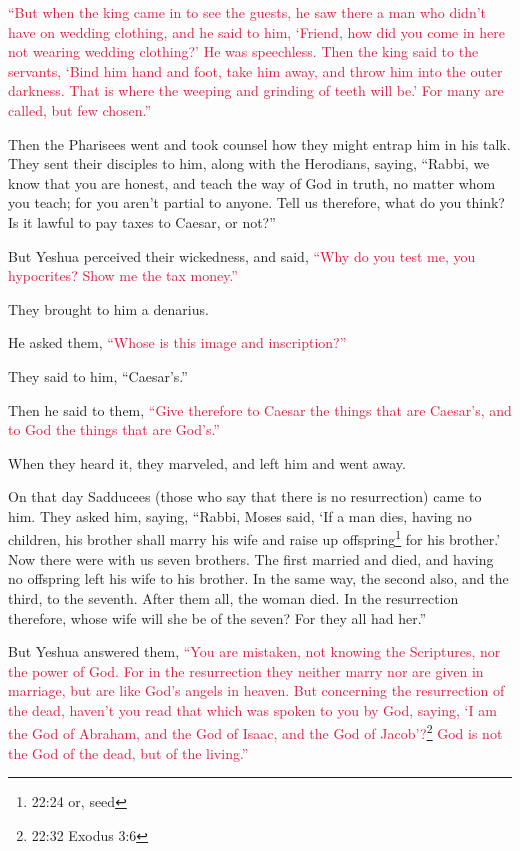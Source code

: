 \myverse{}\textcolor{crimson}{“But when the king came in to see the guests, he saw there
	a man who didn’t have on wedding clothing,
}
\myverse{}\textcolor{crimson}{and he said to him, ‘Friend, how did you come in here not wearing wedding
	clothing?’ He was speechless.
}
\myverse{}\textcolor{crimson}{Then the king said to the servants, ‘Bind him hand and foot, take him
	away, and throw him into the outer darkness. That is where the weeping and grinding of teeth will be.’
}
\myverse{}\textcolor{crimson}{For many are called, but few chosen.”}

\myverse{}Then the Pharisees went and took counsel how they might entrap
him in his talk.
\myverse{}They sent their disciples to him, along with the Herodians, saying, “Rabbi,
we know that you are honest, and teach the way of God in truth, no matter whom you teach; for you aren’t
partial to anyone.
\myverse{}Tell us therefore, what do you think? Is it lawful to pay taxes to Caesar,
or not?”

\myverse{}But Yeshua perceived their wickedness, and said,
\textcolor{crimson}{“Why do you test me, you hypocrites?
}
\myverse{}\textcolor{crimson}{Show me the tax money.”}

They brought to him a denarius.

\myverse{}He asked them,
\textcolor{crimson}{“Whose is this image and inscription?”}

\myverse{}They said to him, “Caesar’s.”

Then he said to them,
\textcolor{crimson}{“Give therefore to Caesar the things that are Caesar’s, and to God the things that are God’s.”}

\myverse{}When they heard it, they marveled, and left him and went away.

\myverse{}On that day Sadducees (those who say that there is no resurrection)
came to him. They asked him,
\myverse{}saying, “Rabbi, Moses said, ‘If a man dies, having no children, his brother
shall marry his wife and raise up offspring\footnote{22:24 or, seed} for his brother.’
\myverse{}Now there were with us seven brothers. The first married and died, and having
no offspring left his wife to his brother.
\myverse{}In the same way, the second also, and the third, to the seventh.
\myverse{}After them all, the woman died.
\myverse{}In the resurrection therefore, whose wife will she be of the seven? For they
all had her.”

\myverse{}But Yeshua answered them,
\textcolor{crimson}{“You are mistaken, not knowing the Scriptures, nor the power of God.
}
\myverse{}\textcolor{crimson}{For in the resurrection they neither marry nor are given in marriage,
	but are like God’s angels in heaven.
}
\myverse{}\textcolor{crimson}{But concerning the resurrection of the dead, haven’t you read that which
	was spoken to you by God, saying,
}
\myverse{}\textcolor{crimson}{‘I am the God of Abraham, and the God of Isaac, and the God of Jacob’?}\footnote{22:32 Exodus 3:6}
\textcolor{crimson}{God is not the God of the dead, but of the living.”}

